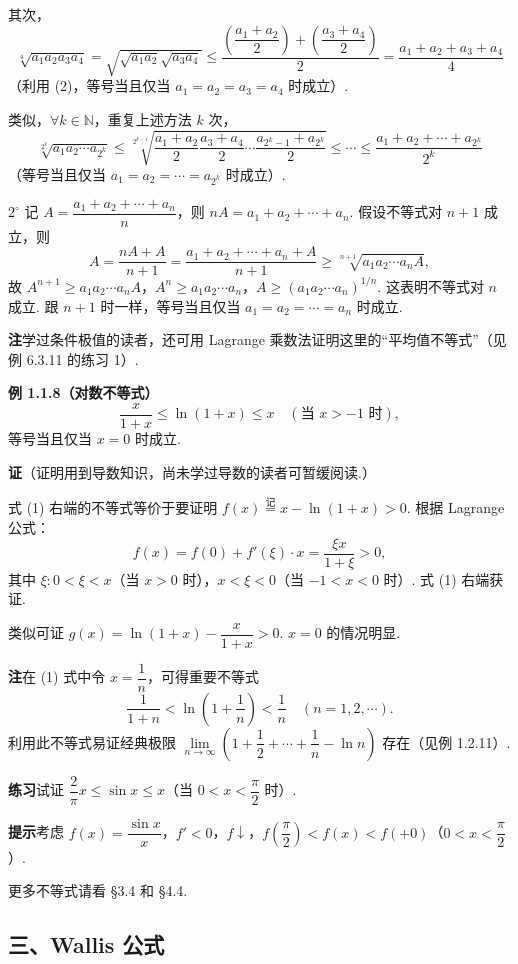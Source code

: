 \documentclass[UTF8, 12pt, fontset=fandol, oneside]{ctexart}
\begin{document}
其次，
\[
  \sqrt[4]{a_1a_2a_3a_4}
  =\sqrt{\sqrt{a_1a_2}\sqrt{a_3a_4}}
  \le \frac{\left(\dfrac{a_1+a_2}{2}\right)+\left(\dfrac{a_3+a_4}{2}\right)}2
  =\frac{a_1+a_2+a_3+a_4}{4}
\]
（利用 (2)，等号当且仅当 $a_1=a_2=a_3=a_4$ 时成立）.

类似，$\forall k\in\mathbb{N}$，重复上述方法 $k$ 次，
\[
  \sqrt[2^k]{a_1a_2\cdots a_{2^k}}
  \le
  \sqrt[2^{k-1}]{\frac{a_1+a_2}{2}\frac{a_3+a_4}{2}\cdots\frac{a_{2^k-1}+a_{2^k}}2}
  \le\cdots\le
  \frac{a_1+a_2+\cdots+a_{2^k}}{2^k}
\]
（等号当且仅当 $a_1=a_2=\cdots=a_{2^k}$ 时成立）.

$2^\circ$ 记 $A=\dfrac{a_1+a_2+\cdots+a_n}{n}$，则 $nA=a_1+a_2+\cdots+a_n$. 假设不等式对 $n+1$ 成立，则
\[
  A=\frac{nA+A}{n+1}=\frac{a_1+a_2+\cdots+a_n+A}{n+1}
  \ge \sqrt[n+1]{a_1a_2\cdots a_nA},
\]
故 $A^{n+1}\ge a_1a_2\cdots a_nA$，$A^n\ge a_1a_2\cdots a_n$，$A\ge(a_1a_2\cdots a_n)^{1/n}$. 这表明不等式对 $n$ 成立. 跟 $n+1$ 时一样，等号当且仅当 $a_1=a_2=\cdots=a_n$ 时成立.

\noindent\textbf{注}\quad 学过条件极值的读者，还可用 Lagrange 乘数法证明这里的“平均值不等式”（见例 6.3.11 的练习 1）.

\noindent\textbf{例 1.1.8（对数不等式）}
\[
  \frac{x}{1+x}\le \ln(1+x)\le x\quad(\text{当 }x>-1\text{ 时}),
\tag{1}
\]
等号当且仅当 $x=0$ 时成立.

\noindent\textbf{证}\quad （证明用到导数知识，尚未学过导数的读者可暂缓阅读.）

式 (1) 右端的不等式等价于要证明 $f(x)\stackrel{\text{记}}{=}x-\ln(1+x)>0$. 根据 Lagrange 公式：
\[
  f(x)=f(0)+f'(\xi)\cdot x=\frac{\xi x}{1+\xi}>0,
\]
其中 $\xi:0<\xi<x$（当 $x>0$ 时），$x<\xi<0$（当 $-1<x<0$ 时）. 式 (1) 右端获证.

类似可证 $g(x)=\ln(1+x)-\dfrac{x}{1+x}>0$. $x=0$ 的情况明显.

\noindent\textbf{注}\quad 在 (1) 式中令 $x=\dfrac1n$，可得重要不等式
\[
  \frac1{1+n}<\ln\left(1+\frac1n\right)<\frac1n\quad(n=1,2,\cdots).
\tag{2}
\]
利用此不等式易证经典极限 $\lim\limits_{n\to\infty}\left(1+\dfrac12+\cdots+\dfrac1n-\ln n\right)$ 存在（见例 1.2.11）.

\noindent\textbf{练习}\quad 试证 $\dfrac2\pi x\le \sin x\le x$（当 $0<x<\dfrac\pi2$ 时）.

\noindent\textbf{提示}\quad 考虑 $f(x)=\dfrac{\sin x}{x}$，$f'<0$，$f\downarrow$，$f\left(\dfrac\pi2\right)<f(x)<f(+0)$（$0<x<\dfrac\pi2$）.

更多不等式请看 §3.4 和 §4.4.

\subsection*{三、Wallis 公式}
\end{document}
